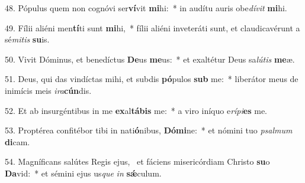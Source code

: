 48. Pópulus quem non cognóvi ser\textbf{ví}vit \textbf{mi}hi:~*  in audítu auris obe\textit{dí}\textit{vit} \textbf{mi}hi.\

49. Fílii aliéni men\textbf{tí}ti sunt \textbf{mi}hi,~*  fílii aliéni inveteráti sunt, et claudicavérunt a sé\textit{mi}\textit{tis} \textbf{su}is.\

50. Vivit Dóminus, et benedíctus \textbf{De}us \textbf{me}us:~*  et exaltétur Deus sa\textit{lú}\textit{tis} \textbf{me}æ.\

51. Deus, qui das vindíctas mihi, et subdis \textbf{pó}pulos \textbf{sub} me:~*  liberátor meus de inimícis meis \textit{i}\textit{ra}\textbf{cún}dis.\

52. Et ab insurgéntibus in me \textbf{ex}al\textbf{tá}\textbf{bis} me:~*  a viro iníquo e\textit{rí}\textit{pi}\textbf{es} me.\

53. Proptérea confitébor tibi in nati\textbf{ó}nibus, \textbf{Dó}\textbf{mi}ne:~*  et nómini tuo \textit{psal}\textit{mum} \textbf{di}cam.\

54. Magníficans salútes Regis ejus, \dag\  et fáciens misericórdiam Christo \textbf{su}o \textbf{Da}vid:~*  et sémini ejus us\textit{que} \textit{in} \textbf{sǽ}culum.\

